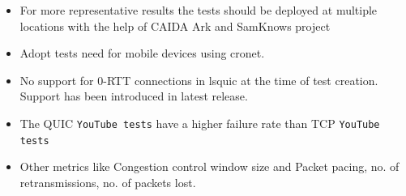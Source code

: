 \begin{frame}
\begin{itemize}
\itemsep2em    
%    
%    
%    
%    
%    
%    
%    
    \item For more representative results the tests should be deployed at multiple locations with the help of CAIDA Ark \cite{CAIDAArk} and SamKnows project\cite{SamKnowsproject}

\item Adopt tests need for mobile devices using cronet\cite{cronet}.

\item No support for 0-RTT connections in lsquic at the time of test creation. Support has been introduced in latest release.

\item The QUIC \texttt{YouTube tests} have a higher failure rate than TCP \texttt{YouTube tests} 

\item Other metrics like Congestion control window size and Packet pacing, no. of retransmissions, no. of packets lost. 


\end{itemize}
\end{frame}

